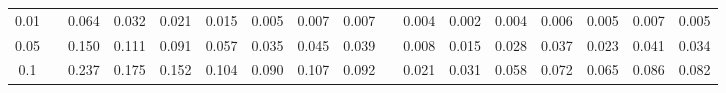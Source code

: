 % 
\begin{tabular}{ccccccccccccccccc}
  \hline
  \hline
0.01 &  & 0.064 & 0.032 & 0.021 & 0.015 & 0.005 & 0.007 & 0.007 &  & 0.004 & 0.002 & 0.004 & 0.006 & 0.005 & 0.007 & 0.005 \\ 
  0.05 &  & 0.150 & 0.111 & 0.091 & 0.057 & 0.035 & 0.045 & 0.039 &  & 0.008 & 0.015 & 0.028 & 0.037 & 0.023 & 0.041 & 0.034 \\ 
  0.1 &  & 0.237 & 0.175 & 0.152 & 0.104 & 0.090 & 0.107 & 0.092 &  & 0.021 & 0.031 & 0.058 & 0.072 & 0.065 & 0.086 & 0.082 \\ 
   \hline
\end{tabular}
